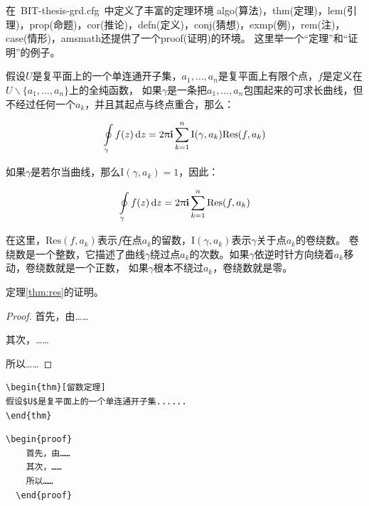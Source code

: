 在~BIT-thesis-grd.cfg~中定义了丰富的定理环境
algo(算法)，thm(定理)，lem(引理)，prop(命题)，cor(推论)，defn(定义)，conj(猜想)，exmp(例)，rem(注)，case(情形)，amsmath还提供了一个proof(证明)的环境。
这里举一个``定理''和``证明''的例子。
\begin{thm}[留数定理]
\label{thm:res}
  假设$U$是复平面上的一个单连通开子集，$a_1,\ldots,a_n$是复平面上有限个点，$f$是定义在$U\backslash \{a_1,\ldots,a_n\}$上的全纯函数，
  如果$\gamma$是一条把$a_1,\ldots,a_n$包围起来的可求长曲线，但不经过任何一个$a_k$，并且其起点与终点重合，那么：

  \begin{equation}
    \label{eq:res}
    \ointop_{\gamma}f(z)\,\mathrm{d}z = 2\uppi\mathbf{i}\sum^n_{k=1}\mathrm{I}(\gamma,a_k)\mathrm{Res}(f,a_k)
  \end{equation}

  如果$\gamma$是若尔当曲线，那么$\mathrm{I}(\gamma, a_k)=1$，因此：

  \begin{equation}
    \label{eq:resthm}
    \ointop_{\gamma}f(z)\,\mathrm{d}z = 2\uppi\mathbf{i}\sum^n_{k=1}\mathrm{Res}(f,a_k)
  \end{equation}


  在这里，$\mathrm{Res}(f, a_k)$表示$f$在点$a_k$的留数，$\mathrm{I}(\gamma,a_k)$表示$\gamma$关于点$a_k$的卷绕数。
  卷绕数是一个整数，它描述了曲线$\gamma$绕过点$a_k$的次数。如果$\gamma$依逆时针方向绕着$a_k$移动，卷绕数就是一个正数，
  如果$\gamma$根本不绕过$a_k$，卷绕数就是零。

  定理\ref{thm:res}的证明。
  
  \begin{proof}
    首先，由……

    其次，……

    所以……
  \end{proof}
  
\end{thm}

\begin{lstlisting}[language={[LaTeX]TeX}, caption={定理环境}]
\begin{thm}[留数定理]
假设$U$是复平面上的一个单连通开子集...... 
\end{thm}
\end{lstlisting}

\begin{lstlisting}[language={[LaTeX]TeX}, caption={证明环境}]
  \begin{proof}
    首先，由……
    其次，……
    所以……
  \end{proof}
\end{lstlisting}

